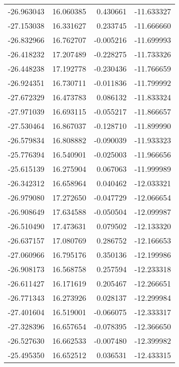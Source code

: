 \begin{tabular}{rrrr}
      -26.963043 &        16.060385 &    0.430661 & -11.633327 \\
      -27.153038 &        16.331627 &    0.233745 & -11.666660 \\
      -26.832966 &        16.762707 &   -0.005216 & -11.699993 \\
      -26.418232 &        17.207489 &   -0.228275 & -11.733326 \\
      -26.448238 &        17.192778 &   -0.230436 & -11.766659 \\
      -26.924351 &        16.730711 &   -0.011836 & -11.799992 \\
      -27.672329 &        16.473783 &    0.086132 & -11.833324 \\
      -27.971039 &        16.693115 &   -0.055217 & -11.866657 \\
      -27.530464 &        16.867037 &   -0.128710 & -11.899990 \\
      -26.579834 &        16.808882 &   -0.090039 & -11.933323 \\
      -25.776394 &        16.540901 &   -0.025003 & -11.966656 \\
      -25.615139 &        16.275904 &    0.067063 & -11.999989 \\
      -26.342312 &        16.658964 &    0.040462 & -12.033321 \\
      -26.979080 &        17.272650 &   -0.047729 & -12.066654 \\
      -26.908649 &        17.634588 &   -0.050504 & -12.099987 \\
      -26.510490 &        17.473631 &    0.079502 & -12.133320 \\
      -26.637157 &        17.080769 &    0.286752 & -12.166653 \\
      -27.060966 &        16.795176 &    0.350136 & -12.199986 \\
      -26.908173 &        16.568758 &    0.257594 & -12.233318 \\
      -26.611427 &        16.171619 &    0.205467 & -12.266651 \\
      -26.771343 &        16.273926 &    0.028137 & -12.299984 \\
      -27.401604 &        16.519001 &   -0.066075 & -12.333317 \\
      -27.328396 &        16.657654 &   -0.078395 & -12.366650 \\
      -26.527630 &        16.662533 &   -0.007480 & -12.399982 \\
      -25.495350 &        16.652512 &    0.036531 & -12.433315 \\

\end{tabular}
